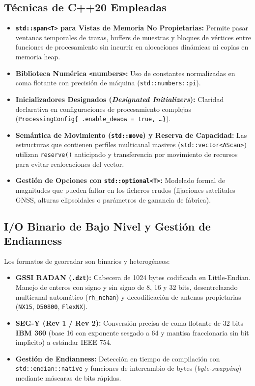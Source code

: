 \documentclass[11pt,a4paper]{article}
\begin{document}
\subsection{T{\'e}cnicas de C++20 Empleadas}
\begin{itemize}
    \item \textbf{\texttt{std::span<T>} para Vistas de Memoria No Propietarias:} Permite pasar ventanas temporales de trazas, buffers de muestras y bloques de v{\'e}rtices entre funciones de procesamiento sin incurrir en alocaciones din{\'a}micas ni copias en memoria heap.
    \item \textbf{Biblioteca Num{\'e}rica \texttt{<}numbers\texttt{>}:} Uso de constantes normalizadas en coma flotante con precisi{\'o}n de m{\'a}quina (\texttt{std::numbers::pi}).
    \item \textbf{Inicializadores Designados (\textit{Designated Initializers}):} Claridad declarativa en configuraciones de procesamiento complejas (\texttt{ProcessingConfig\{ .enable\_dewow = true, \dots \}}).
    \item \textbf{Sem{\'a}ntica de Movimiento (\texttt{std::move}) y Reserva de Capacidad:} Las estructuras que contienen perfiles multicanal masivos (\texttt{std::vector<AScan>}) utilizan \texttt{reserve()} anticipado y transferencia por movimiento de recursos para evitar realocaciones del vector.
    \item \textbf{Gesti{\'o}n de Opciones con \texttt{std::optional<T>}:} Modelado formal de magnitudes que pueden faltar en los ficheros crudos (fijaciones satelitales GNSS, alturas elipsoidales o par{\'a}metros de ganancia de f{\'a}brica).
\end{itemize}

\subsection{I/O Binario de Bajo Nivel y Gesti{\'o}n de Endianness}
Los formatos de georradar son binarios y heterog{\'e}neos:
\begin{itemize}
    \item \textbf{GSSI RADAN (\texttt{.dzt}):} Cabecera de 1024 bytes codificada en Little-Endian. Manejo de enteros con signo y sin signo de 8, 16 y 32 bits, desentrelazado multicanal autom{\'a}tico (\texttt{rh\_nchan}) y decodificaci{\'o}n de antenas propietarias (\texttt{NX15}, \texttt{D50800}, \texttt{FlexNX}).
    \item \textbf{SEG-Y (Rev 1 / Rev 2):} Conversi{\'o}n precisa de coma flotante de 32 bits \textbf{IBM 360} (base 16 con exponente sesgado a 64 y mantisa fraccionaria sin bit impl{\'\i}cito) a est{\'a}ndar IEEE 754.
    \item \textbf{Gesti{\'o}n de Endianness:} Detecci{\'o}n en tiempo de compilaci{\'o}n con \texttt{std::endian::native} y funciones de intercambio de bytes (\textit{byte-swapping}) mediante m{\'a}scaras de bits r{\'a}pidas.
\end{itemize}
\end{document}
